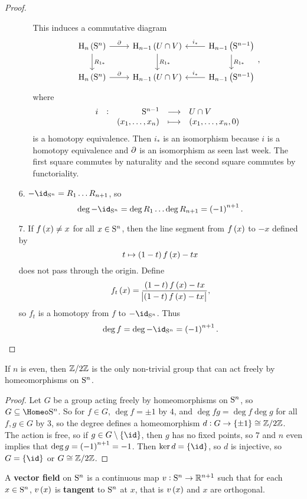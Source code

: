 \begin{proof}
\begin{itemize}
\begin{itemize}[leftmargin=0.5in]
This induces a commutative diagram
$$
\begin{tikzcd}
\H_n\br{\S^n} \arrow{r}{\da} \arrow{d}{R_{1*}} & \H_{n - 1}\br{U \cap V} \arrow{d}{R_{1*}} & \H_{n - 1}\br{\S^{n - 1}}\arrow{l}[swap]{i_*} \arrow{d}{R_{1*}} \\
\H_n\br{\S^n} \arrow{r}{\da} & \H_{n - 1}\br{U \cap V} & \H_{n - 1}\br{\S^{n - 1}}\arrow{l}[swap]{i_*}
\end{tikzcd},
$$
where
$$ \function[i]{\S^{n - 1}}{U \cap V}{\br{x_1, \dots, x_n}}{\br{x_1, \dots, x_n, 0}} $$
is a homotopy equivalence. Then $ i_* $ is an isomorphism because $ i $ is a homotopy equivalence and $ \da $ is an isomorphism as seen last week. The first square commutes by naturality and the second square commutes by functoriality.
\end{itemize}
\item[$ 6 $.] $ -\id_{\S^n} = R_1 \dots R_{n + 1} $, so
$$ \deg -\id_{\S^n} = \deg R_1 \dots \deg R_{n + 1} = \br{-1}^{n + 1}. $$
\item[$ 7 $.] If $ f\br{x} \ne x $ for all $ x \in \S^n $, then the line segment from $ f\br{x} $ to $ -x $ defined by
$$ t \mapsto \br{1 - t}f\br{x} - tx $$
does not pass through the origin. Define
$$ f_t\br{x} = \dfrac{\br{1 - t}f\br{x} - tx}{\abs{\br{1 - t}f\br{x} - tx}}, $$
so $ f_t $ is a homotopy from $ f $ to $ -\id_{\S^n} $. Thus
$$ \deg f = \deg -\id_{\S^n} = \br{-1}^{n + 1}. $$
\end{itemize}
\end{proof}

\begin{proposition}
If $ n $ is even, then $ \ZZ / 2\ZZ $ is the only non-trivial group that can act freely by homeomorphisms on $ \S^n $.
\end{proposition}

\begin{proof}
Let $ G $ be a group acting freely by homeomorphisms on $ \S^n $, so $ G \subseteq \Homeo \S^n $. So for $ f \in G $, $ \deg f = \pm 1 $ by $ 4 $, and $ \deg fg = \deg f\deg g $ for all $ f, g \in G $ by $ 3 $, so the degree defines a homeomorphism $ d : G \to \cbr{\pm 1} \cong \ZZ / 2\ZZ $. The action is free, so if $ g \in G \setminus \cbr{\id} $, then $ g $ has no fixed points, so $ 7 $ and $ n $ even implies that $ \deg g = \br{-1}^{n + 1} = -1 $. Then $ \ker d = \cbr{\id} $, so $ d $ is injective, so $ G = \cbr{\id} $ or $ G \cong \ZZ / 2\ZZ $.
\end{proof}

\begin{definition*}
A \textbf{vector field} on $ \S^n $ is a continuous map $ v : \S^n \to \RR^{n + 1} $ such that for each $ x \in \S^n $, $ v\br{x} $ is \textbf{tangent} to $ \S^n $ at $ x $, that is $ v\br{x} $ and $ x $ are orthogonal.
\end{definition*}

